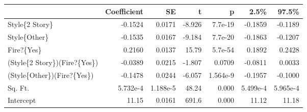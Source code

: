 \begin{tabular}{lrrrrrr}
\toprule
{} &  Coefficient &       SE &      t &        p &     2.5\% &    97.5\% \\
\midrule
Style\{2 Story\}               &      -0.1524 &   0.0171 & -8.926 &  7.7e-19 &  -0.1859 &  -0.1189 \\
Style\{Other\}                 &      -0.1535 &   0.0167 & -9.184 &  7.7e-20 &  -0.1863 &  -0.1207 \\
Fire?\{Yes\}                   &       0.2160 &   0.0137 &  15.79 &  5.7e-54 &   0.1892 &   0.2428 \\
(Style\{2 Story\})(Fire?\{Yes\}) &      -0.0389 &   0.0215 & -1.807 &   0.0709 &  -0.0811 &   0.0033 \\
(Style\{Other\})(Fire?\{Yes\})   &      -0.1478 &   0.0244 & -6.057 & 1.564e-9 &  -0.1957 &  -0.1000 \\
Sq. Ft.                      &     5.732e-4 & 1.188e-5 &  48.24 &    0.000 & 5.499e-4 & 5.965e-4 \\
Intercept                    &        11.15 &   0.0161 &  691.6 &    0.000 &    11.12 &    11.18 \\
\bottomrule
\end{tabular}
